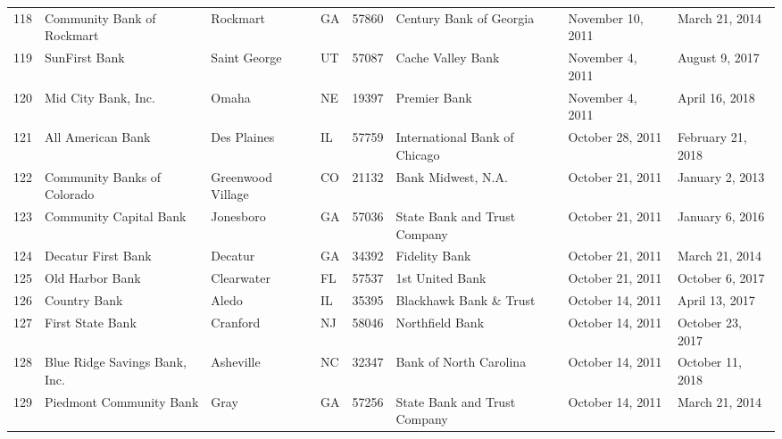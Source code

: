 \begin{tabular}{llllrlll}
118 &                         Community Bank of Rockmart &            Rockmart &  GA &  57860 &                            Century Bank of Georgia &   November 10, 2011 &      March 21, 2014 \\
119 &                                      SunFirst Bank &        Saint George &  UT &  57087 &                                  Cache Valley Bank &    November 4, 2011 &      August 9, 2017 \\
120 &                                Mid City Bank, Inc. &               Omaha &  NE &  19397 &                                       Premier Bank &    November 4, 2011 &      April 16, 2018 \\
121 &                                  All American Bank &         Des Plaines &  IL &  57759 &                      International Bank of Chicago &    October 28, 2011 &   February 21, 2018 \\
122 &                        Community Banks of Colorado &   Greenwood Village &  CO &  21132 &                                 Bank Midwest, N.A. &    October 21, 2011 &     January 2, 2013 \\
123 &                             Community Capital Bank &           Jonesboro &  GA &  57036 &                       State Bank and Trust Company &    October 21, 2011 &     January 6, 2016 \\
124 &                                 Decatur First Bank &             Decatur &  GA &  34392 &                                      Fidelity Bank &    October 21, 2011 &      March 21, 2014 \\
125 &                                    Old Harbor Bank &          Clearwater &  FL &  57537 &                                    1st United Bank &    October 21, 2011 &     October 6, 2017 \\
126 &                                       Country Bank &               Aledo &  IL &  35395 &                             Blackhawk Bank \& Trust &    October 14, 2011 &      April 13, 2017 \\
127 &                                   First State Bank &            Cranford &  NJ &  58046 &                                    Northfield Bank &    October 14, 2011 &    October 23, 2017 \\
128 &                      Blue Ridge Savings Bank, Inc. &           Asheville &  NC &  32347 &                             Bank of North Carolina &    October 14, 2011 &    October 11, 2018 \\
129 &                            Piedmont Community Bank &                Gray &  GA &  57256 &                       State Bank and Trust Company &    October 14, 2011 &      March 21, 2014 \\

\end{tabular}
